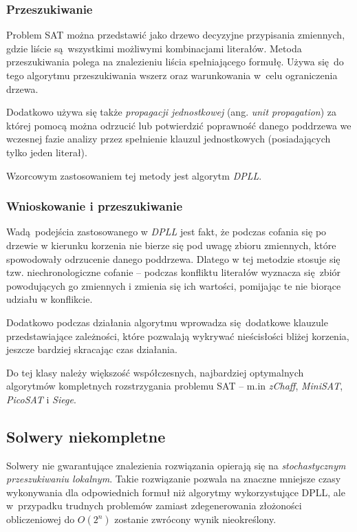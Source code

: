 \subsubsection{Przeszukiwanie}
Problem SAT można przedstawić jako drzewo decyzyjne przypisania zmiennych, gdzie liście są wszystkimi możliwymi kombinacjami literałów.
Metoda przeszukiwania polega na znalezieniu liścia spełniającego formułę. Używa się do tego algorytmu przeszukiwania wszerz oraz warunkowania
w~celu ograniczenia drzewa. 

Dodatkowo używa się także \textit{propagacji jednostkowej} (ang. \textit{unit propagation}) za której pomocą 
można odrzucić lub potwierdzić poprawność danego poddrzewa we wczesnej fazie analizy przez spełnienie klauzul jednostkowych (posiadających tylko jeden literał).

Wzorcowym zastosowaniem tej metody jest algorytm \textit{DPLL}.

\subsubsection{Wnioskowanie i przeszukiwanie}
Wadą podejścia zastosowanego w \textit{DPLL} jest fakt, że podczas cofania się po drzewie w kierunku korzenia nie bierze się pod uwagę
zbioru zmiennych, które spowodowały odrzucenie danego poddrzewa.
Dlatego w tej metodzie stosuje się tzw. niechronologiczne cofanie -- podczas konfliktu literałów wyznacza się zbiór powodujących 
go zmiennych i zmienia się ich wartości, pomijając te nie biorące udziału w konflikcie.

Dodatkowo podczas działania algorytmu wprowadza się dodatkowe klauzule przedstawiające zależności, które pozwalają wykrywać nieścisłości 
bliżej korzenia, jeszcze bardziej skracając czas działania.

Do tej klasy należy większość współczesnych, najbardziej optymalnych algorytmów kompletnych rozstrzygania problemu SAT -- m.in 
\textit{zChaff}, \textit{MiniSAT}, \textit{PicoSAT} i \textit{Siege}.

\subsection{Solwery niekompletne}
Solwery nie gwarantujące znalezienia rozwiązania opierają się na \textit{stochastycznym przeszukiwaniu lokalnym}.
Takie rozwiązanie pozwala na znaczne mniejsze czasy wykonywania dla odpowiednich formuł niż algorytmy wykorzystujące DPLL, ale
w~przypadku trudnych problemów zamiast zdegenerowania złożoności obliczeniowej do $O(2^n)$ zostanie zwrócony wynik nieokreślony.  

